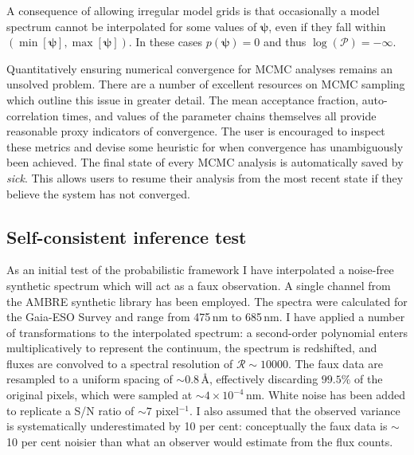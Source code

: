 \documentclass{aastex}
\newcommand{\sick}{\textit{sick}}
\begin{document}
A consequence of allowing irregular model grids is that occasionally a model spectrum cannot be interpolated for some values of $\bm{\psi}$, even if they fall within $\left(\min\left[\bm{\psi}\right], \max\left[\bm{\psi}\right]\right)$. In these cases $p\left(\bm{\psi}\right) = 0$ and thus $\log\left(\mathcal{P}\right) = -\infty$.

Quantitatively ensuring numerical convergence for MCMC analyses remains an unsolved problem. There are a number of excellent resources on MCMC sampling which outline this issue in greater detail. The mean acceptance fraction, auto-correlation times, and values of the parameter chains themselves all provide reasonable proxy indicators of convergence. The user is encouraged to inspect these metrics and devise some heuristic for when convergence has unambiguously been achieved. The final state of every MCMC analysis is automatically saved by \sick{}. This allows users to resume their analysis from the most recent state if they believe the system has not converged.


\subsection{Self-consistent inference test}
\label{sec:inference-test}

As an initial test of the probabilistic framework I have interpolated a noise-free synthetic spectrum which will act as a faux observation. A single channel from the AMBRE synthetic library \citep{ambre} has been employed. The spectra were calculated for the Gaia-ESO Survey \citep{gaia-eso} and range from 475\,nm to 685\,nm. I have applied a number of transformations to the interpolated spectrum: a second-order polynomial enters multiplicatively to represent the continuum, the spectrum is redshifted, and fluxes are convolved to a spectral resolution of $\mathcal{R} \sim 10000$. The faux data are resampled to a uniform spacing of $\sim{}0.8$\,\AA{}, effectively discarding $99.5\%$ of the original pixels, which were sampled at $\sim4\times10^{-4}$\,nm. White noise has been added to replicate a S/N ratio of $\sim 7$ pixel$^{-1}$. I also assumed that the observed variance is systematically underestimated by 10 per cent: conceptually the faux data is $\sim{}$10 per cent noisier than what an observer would estimate from the flux counts. 

\end{document}
